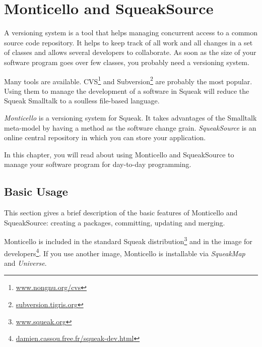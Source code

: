 \documentclass[a4paper,10pt,twoside]{book}
\begin{document}
	\renewcommand{\nnbb}[2]{} %
	\sloppy
\fi

\newcommand{\figlabel}[1]{\label{fig:#1}}
\newcommand{\seclabel}[1]{\label{sec:#1}}

\chapter{Monticello and SqueakSource}

A versioning system is a tool that helps managing concurrent access to a common source code repository. It helps to keep track of all work and all changes in a set of classes and allows several developers to collaborate. As soon as the size of your software program goes over few classes, you probably need a versioning system.

Many tools are available. CVS\footnote{\href{http://www.nongnu.org/cvs/}{www.nongnu.org/cvs}} and Subversion\footnote{\href{http://subversion.tigris.org/}{subversion.tigris.org}} are probably the most popular. Using them to manage the development of a software in Squeak will reduce the Squeak Smalltalk to a soulless file-based language. 

\emph{Monticello} is a versioning system for Squeak. It takes advantages of the Smalltalk meta-model by having a method as the software change grain. \emph{SqueakSource} is an online central repository in which you can store your application.

In this chapter, you will read about using Monticello and SqueakSource to manage your software program for day-to-day programming.


\section{Basic Usage}

This section gives a brief description of the basic features of Monticello and SqueakSource: creating a packages, committing, updating and merging.

Monticello is included in the standard Squeak distribution\footnote{\href{http://www.squeak.org}{www.squeak.org}} and in the image for developers\footnote{\href{http://damien.cassou.free.fr/squeak-dev.html}{damien.cassou.free.fr/squeak-dev.html}}. If you use another image, Monticello is installable via \emph{SqueakMap} and \emph{Universe}.
\end{document}
